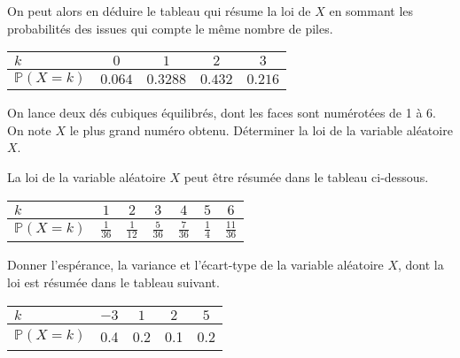 \documentclass[11pt,fleqn, openany]{book} %
\begin{document}
\begin{solution}
On peut alors en déduire le tableau qui résume la loi de $X$ en sommant les probabilités des issues qui compte le même nombre de piles.

\begin{center}
\begin{tabular}{|l|c|c|c|c|}
\hline
$k$ & $0$ & $1$ & $2$  & $3$ \\
\hline
$\mathbb{P}(X=k)$ & $0.064$ & $0.3288$ & $0.432$ & $0.216$ \\
\hline \end{tabular}
\end{center}

\end{solution}






\begin{exercise}On lance deux dés cubiques équilibrés, dont les faces sont numérotées de 1 à 6. On note $X$ le plus grand numéro obtenu. Déterminer la loi de la variable aléatoire $X$.\newpage \end{exercise}

\begin{solution}La loi de la variable aléatoire $X$ peut être résumée dans le tableau ci-dessous.

\begin{center}
\begin{tabular}{|l|c|c|c|c|c|c|}
\hline
$k$ & $1$ & $2$ & $3$  & $4$ &$5$ & $6$ \\
\hline
$\mathbb{P}(X=k)$ & $\frac{1}{36}$ & $\frac{1}{12}$ & $\frac{5}{36}$ & $\frac{7}{36}$ & $\frac{1}{4}$ & $\frac{11}{36}$ \\
\hline \end{tabular}
\end{center}
\end{solution}




\begin{exercise}Donner l'espérance, la variance et l'écart-type de la variable aléatoire $X$, dont la loi est résumée dans le tableau suivant.
\begin{center}
\begin{tabular}{|l|c|c|c|c|}
\hline
$k$ & $-3$ & $1$ & $2$ & $5$ \\
\hline
$\mathbb{P}(X=k)$ & 0.4 & 0.2 & 0.1 & 0.2 \\
\hline \end{tabular}
\end{center} \end{exercise}
\end{document}
